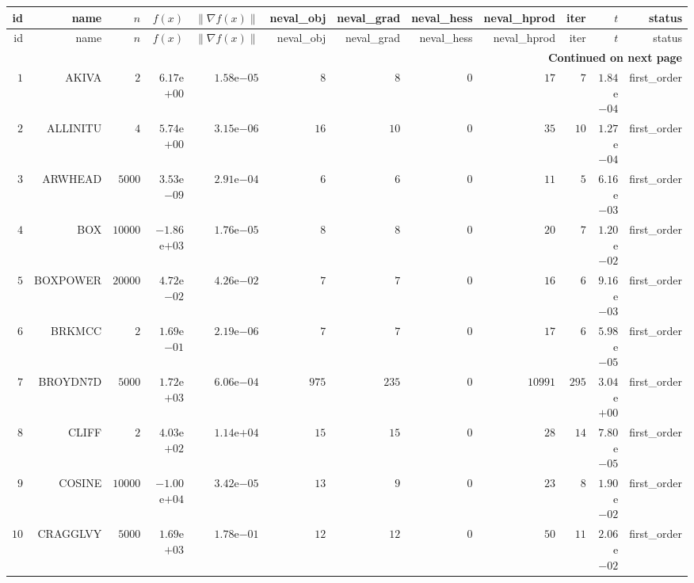 \begin{longtable}{rrrrrrrrrrrr}
  \hline
  id & name & \(n\) & \(f(x)\) & \(\|\nabla f(x)\|\) & neval\_obj & neval\_grad & neval\_hess & neval\_hprod & iter & \(t\) & status \\\hline
  \endfirsthead
  \hline
  id & name & \(n\) & \(f(x)\) & \(\|\nabla f(x)\|\) & neval\_obj & neval\_grad & neval\_hess & neval\_hprod & iter & \(t\) & status \\\hline
  \endhead
  \hline
  \multicolumn{12}{r}{{\bfseries Continued on next page}}\\
  \hline
  \endfoot
  \endlastfoot
  \(     1\) & AKIVA & \(     2\) & \( 6.17\)e\(+00\) & \( 1.58\)e\(-05\) & \(     8\) & \(     8\) & \(     0\) & \(    17\) & \(     7\) & \( 1.84\)e\(-04\) & first\_order \\
  \(     2\) & ALLINITU & \(     4\) & \( 5.74\)e\(+00\) & \( 3.15\)e\(-06\) & \(    16\) & \(    10\) & \(     0\) & \(    35\) & \(    10\) & \( 1.27\)e\(-04\) & first\_order \\
  \(     3\) & ARWHEAD & \(  5000\) & \( 3.53\)e\(-09\) & \( 2.91\)e\(-04\) & \(     6\) & \(     6\) & \(     0\) & \(    11\) & \(     5\) & \( 6.16\)e\(-03\) & first\_order \\
  \(     4\) & BOX & \( 10000\) & \(-1.86\)e\(+03\) & \( 1.76\)e\(-05\) & \(     8\) & \(     8\) & \(     0\) & \(    20\) & \(     7\) & \( 1.20\)e\(-02\) & first\_order \\
  \(     5\) & BOXPOWER & \( 20000\) & \( 4.72\)e\(-02\) & \( 4.26\)e\(-02\) & \(     7\) & \(     7\) & \(     0\) & \(    16\) & \(     6\) & \( 9.16\)e\(-03\) & first\_order \\
  \(     6\) & BRKMCC & \(     2\) & \( 1.69\)e\(-01\) & \( 2.19\)e\(-06\) & \(     7\) & \(     7\) & \(     0\) & \(    17\) & \(     6\) & \( 5.98\)e\(-05\) & first\_order \\
  \(     7\) & BROYDN7D & \(  5000\) & \( 1.72\)e\(+03\) & \( 6.06\)e\(-04\) & \(   975\) & \(   235\) & \(     0\) & \( 10991\) & \(   295\) & \( 3.04\)e\(+00\) & first\_order \\
  \(     8\) & CLIFF & \(     2\) & \( 4.03\)e\(+02\) & \( 1.14\)e\(+04\) & \(    15\) & \(    15\) & \(     0\) & \(    28\) & \(    14\) & \( 7.80\)e\(-05\) & first\_order \\
  \(     9\) & COSINE & \( 10000\) & \(-1.00\)e\(+04\) & \( 3.42\)e\(-05\) & \(    13\) & \(     9\) & \(     0\) & \(    23\) & \(     8\) & \( 1.90\)e\(-02\) & first\_order \\
  \(    10\) & CRAGGLVY & \(  5000\) & \( 1.69\)e\(+03\) & \( 1.78\)e\(-01\) & \(    12\) & \(    12\) & \(     0\) & \(    50\) & \(    11\) & \( 2.06\)e\(-02\) & first\_order \\

\end{longtable}

